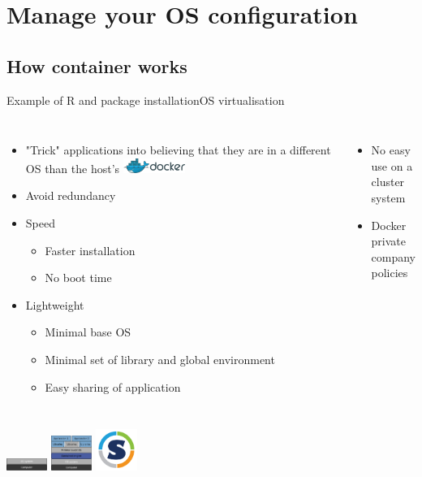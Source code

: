 \section{Manage your OS configuration}
\subsection{How container works}

\begin{frame}{Example of R and package installation}{OS virtualisation}
\begin{columns}
\begin{itemize}
	\item "Trick" applications into believing that they are in a different OS than the host’s \includegraphics[width=0.2\textwidth]{images/docker_logo2.png}
	\item Avoid redundancy
	\item Speed
	\begin{itemize}
		\item Faster installation
		\item No boot time
	\end{itemize}
	\item Lightweight
	\begin{itemize}
		\item Minimal base OS
		\item Minimal set of library and global environment 
		\item Easy sharing of application 
	\end{itemize}	
\end{itemize}
\begin{itemize}
	\item No easy use on a cluster system
	\item Docker private company policies
\end{itemize}
\end{columns}
\includegraphics[width=0.1\textwidth]{images/docker_env_1.pdf} 
\includegraphics[width=0.1\textwidth]{images/docker_env_2.pdf} 
\includegraphics[width=0.1\textwidth]{images/singularity_logo.pdf}

\end{frame}
